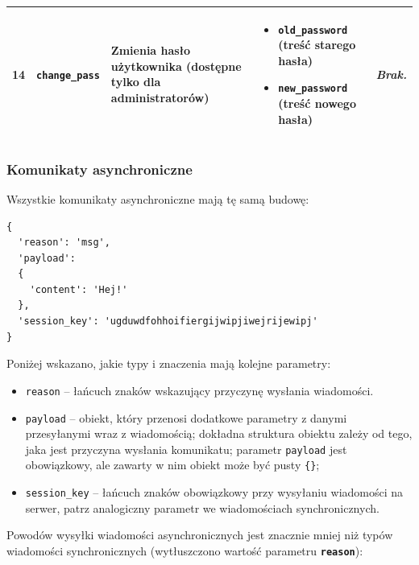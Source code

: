 {\begin{longtable}{ | l | l | l | l | l | }
\hline

\parbox[t]{0.8cm}{
	14

} & \parbox[t]{1.7cm}{\strut
	\texttt{change\_pass}

\strut} & \parbox{4.1cm}{
	Zmienia hasło użytkownika (dostępne tylko dla administratorów)

} & \parbox{3.9cm}{
	\begin{itemize}
		\item \texttt{old\_password} (treść starego hasła)
		\item \texttt{new\_password} (treść nowego hasła)
	\end{itemize}


} & \parbox{3.9cm}{
	\textit{Brak.}
} \\

\hline

\end{longtable}
}

\subsubsection{Komunikaty asynchroniczne}
Wszystkie komunikaty asynchroniczne mają tę samą budowę:

\begin{lstlisting}
{
  'reason': 'msg',
  'payload':
  {
    'content': 'Hej!'
  },
  'session_key': 'ugduwdfohhoifiergijwipjiwejrijewipj'
}
\end{lstlisting}

Poniżej wskazano, jakie typy i znaczenia mają kolejne parametry:
\begin{itemize}
	\item \texttt{reason} -- łańcuch znaków wskazujący przyczynę wysłania wiadomości.

	\item \texttt{payload} -- obiekt, który przenosi dodatkowe parametry z danymi
	przesyłanymi wraz z wiadomością;
	dokładna struktura obiektu zależy od tego, jaka jest przyczyna wysłania
	komunikatu; parametr \texttt{payload} jest obowiązkowy, ale
	zawarty w nim obiekt może być pusty \texttt{\{\}};

	\item \texttt{session\_key} -- łańcuch znaków obowiązkowy przy wysyłaniu
	wiadomości na serwer, patrz analogiczny parametr we wiadomościach synchronicznych.

\end{itemize}

Powodów wysyłki wiadomości asynchronicznych jest znacznie mniej niż typów wiadomości
synchronicznych (wytłuszczono wartość parametru \textbf{\texttt{reason}}):

